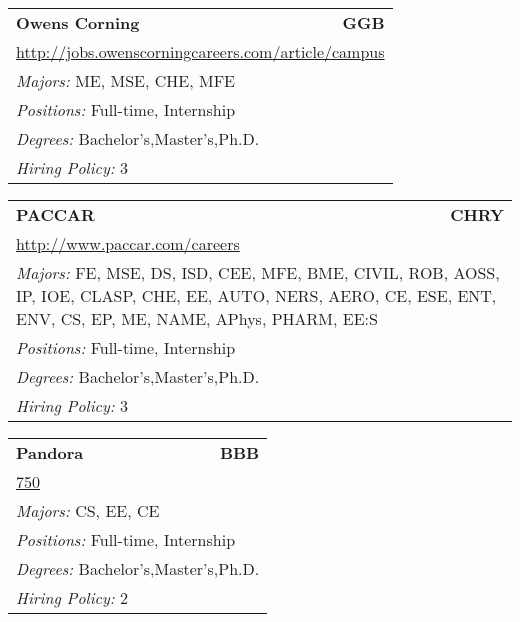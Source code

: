 \documentclass[twoside]{article}
\begin{document}
\begin{center}
\begin{multicols}{3}
\begin{FlushLeft}
\begin{minipage}{.9\columnwidth}
\end{minipage}
 
\begin{minipage}{.9\columnwidth}\begin{tabularx}{.95\columnwidth}{Xr}
                 {\Large\bf Owens Corning} & {\Large\bf GGB}\\
    \multicolumn{2}{p{.95\columnwidth}}{\url{http://jobs.owenscorningcareers.com/article/campus}}\\
    \multicolumn{2}{p{.95\columnwidth}}{\emph{Majors:} ME, MSE, CHE, MFE}\\
    \multicolumn{2}{p{.95\columnwidth}}{\emph{Positions:} Full-time, Internship}\\
    \multicolumn{2}{p{.95\columnwidth}}{\emph{Degrees:} Bachelor's,Master's,Ph.D.}\\
    \multicolumn{2}{p{.95\columnwidth}}{\emph{Hiring Policy:} 3}\\
    \end{tabularx}
    
\end{minipage}
 
\begin{minipage}{.9\columnwidth}\begin{tabularx}{.95\columnwidth}{Xr}
                 {\Large\bf PACCAR} & {\Large\bf CHRY}\\
    \multicolumn{2}{p{.95\columnwidth}}{\url{http://www.paccar.com/careers}}\\
    \multicolumn{2}{p{.95\columnwidth}}{\emph{Majors:} FE, MSE, DS, ISD, CEE, MFE, BME, CIVIL, ROB, AOSS, IP, IOE, CLASP, CHE, EE, AUTO, NERS, AERO, CE, ESE, ENT, ENV, CS, EP, ME, NAME, APhys, PHARM, EE:S}\\
    \multicolumn{2}{p{.95\columnwidth}}{\emph{Positions:} Full-time, Internship}\\
    \multicolumn{2}{p{.95\columnwidth}}{\emph{Degrees:} Bachelor's,Master's,Ph.D.}\\
    \multicolumn{2}{p{.95\columnwidth}}{\emph{Hiring Policy:} 3}\\
    \end{tabularx}
    
\end{minipage}
 
\begin{minipage}{.9\columnwidth}\begin{tabularx}{.95\columnwidth}{Xr}
                 {\Large\bf Pandora} & {\Large\bf BBB}\\
    \multicolumn{2}{p{.95\columnwidth}}{\url{750}}\\
    \multicolumn{2}{p{.95\columnwidth}}{\emph{Majors:} CS, EE, CE}\\
    \multicolumn{2}{p{.95\columnwidth}}{\emph{Positions:} Full-time, Internship}\\
    \multicolumn{2}{p{.95\columnwidth}}{\emph{Degrees:} Bachelor's,Master's,Ph.D.}\\
    \multicolumn{2}{p{.95\columnwidth}}{\emph{Hiring Policy:} 2}\\
    \end{tabularx}
    

\end{minipage}
\end{FlushLeft}
\end{multicols}
\end{center}
\end{document}
